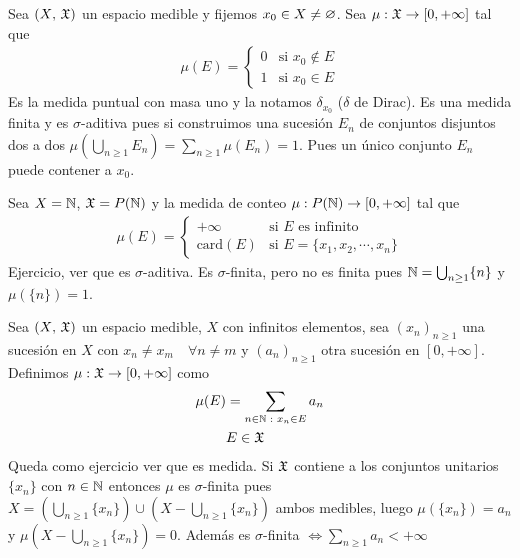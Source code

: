\begin{eg}
    Sea \((X\text{, } \mathfrak{X})\) un espacio medible y fijemos \(x_0 \in X \neq \varnothing\).
    Sea \(\mu : \mathfrak{X} \to [0, +\infty]\) tal que \begin{align*}
        \mu(E) = \begin{cases}
                     0 & \text{si } x_0 \notin E \\
                     1 & \text{si } x_0 \in E
                 \end{cases}
    \end{align*}
    Es la medida puntual con masa uno y la notamos \(\delta_{x_0}\) (\(\delta\) de Dirac). Es una medida finita y es \(\sigma\)-aditiva pues si construimos
    una sucesión \(E_n\) de conjuntos disjuntos dos a dos \(\mu (\bigcup_{n \geq 1} E_n) = \sum_{n \geq 1} \mu(E_n) = 1\). Pues un único conjunto \(E_n\) puede contener a \(x_0\).
\end{eg}

\clearpage

\begin{eg}
    Sea \(X = \mathbb{N}\), \(\mathfrak{X} = P(\mathbb{N})\) y la medida de conteo \(\mu : P(\mathbb{N}) \to [0, +\infty]\) tal que \begin{align*}
        \mu(E) = \begin{cases}
                     +\infty        & \text{si } E \text{ es infinito}           \\
                     \text{card}(E) & \text{si } E = \{ x_1, x_2, \cdots, x_n \}
                 \end{cases}
    \end{align*}
    Ejercicio, ver que es \(\sigma\)-aditiva. Es \(\sigma\)-finita, pero no es finita pues \(\mathbb{N} = \bigcup_{n \geq 1} \{ n \}\) y \(\mu(\{ n \}) = 1\).
\end{eg}

\begin{eg}
    Sea \((X\text{, } \mathfrak{X})\) un espacio medible, \(X\) con infinitos elementos, sea \((x_n)_{n \geq 1}\) una sucesión en \(X\) con \(x_n \neq x_m \quad \forall n \neq m\) y
    \((a_n)_{n \geq 1}\) otra sucesión en \([0, +\infty]\). Definimos \(\mu : \mathfrak{X} \to [0, +\infty]\) como \begin{align*}
        \mu(E) & = \sum_{n \in \mathbb{N} \text{ } : \text{ } x_n \in E} a_n \\
               & E \in \mathfrak{X}
    \end{align*}
    Queda como ejercicio ver que es medida.
    Si \(\mathfrak{X}\) contiene a los conjuntos unitarios \(\{ x_n \}\) con \(n \in \mathbb{N}\) entonces \(\mu\) es \(\sigma\)-finita pues \(X = (\bigcup_{n \geq 1} \{ x_n \}) \cup (X - \bigcup_{n \geq 1} \{ x_n \})\) ambos medibles, luego
    \(\mu(\{ x_n \}) = a_n\) y \(\mu(X - \bigcup_{n \geq 1} \{ x_n \}) = 0\).
    Además es \(\sigma\)-finita \(\iff \sum_{n \geq 1} a_n < +\infty\)
\end{eg}

